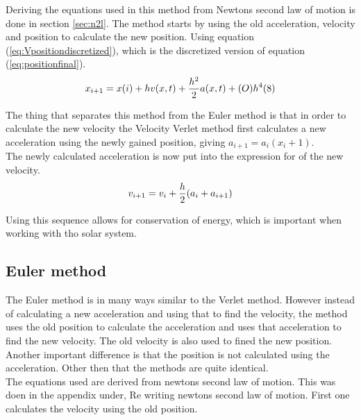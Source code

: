\documentclass{article}
\begin{document}
    Deriving the equations used in this method from Newtons second law of motion is done in section \ref{sec:n2l}. The method starts by using the old acceleration, velocity and position to calculate the new position. Using equation (\ref{eq:Vpositiondiscretized}), which is the discretized version of equation (\ref{eq:positionfinal}). \\

    \begin{equation}    \label{eq:Vpositiondiscretized}
        x_{i+1} = x(i) + h v(x,t) + \frac{h^{2}}{2} a(x,t) + (O)h^{4} (8)\\
    \end{equation}

    The thing that separates this method from the Euler method is that in order to calculate the new velocity the Velocity Verlet method first calculates a new acceleration using the newly gained position, giving $a_{i+1} = a_i (x_i+1)$. \\

    The newly calculated acceleration is now put into the expression for of the new velocity. \\

    \begin{equation}    \label{eq:Vvelocitydiscretized}
        v_{i+1} = v_i + \frac{h}{2} (a_i+a_{i+1})  \\
    \end{equation}

    Using this sequence allows for conservation of energy, which is important when working with tho solar system. \\

\subsection{Euler method}

    The Euler method is in many ways similar to the Verlet method. However instead of calculating a new acceleration and using that to find the velocity, the method uses the old position to calculate the acceleration and uses that acceleration to find the new velocity. The old velocity is also used to fined the new position. Another important difference is that the position is not calculated using the acceleration. Other then that the methods are quite identical. \\

    The equations used are derived from newtons second law of motion. This was doen in the appendix under, Re writing newtons second law of motion.
    First one calculates the velocity using the old position. \\
\end{document}

